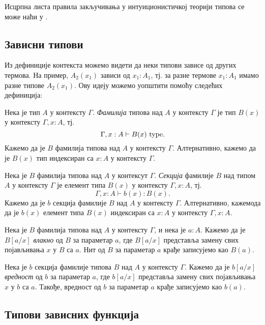 \documentclass[12pt,oneside]{memoir}
\begin{document}
Исцрпна листа правила закључивања у интуиционистичкој теорији типова се може наћи у \cite{rijke2022intro}.

\subsection{Зависни типови}

Из дефиниције контекста можемо видети да неки типови зависе од других термова. На пример, $A_2(x_1)$ зависи од $x_1 : A_1$, тј. за разне термове $x_1 : A_1$ имамо разне типове $A_2(x_1)$. Ову идеју можемо уопштити помоћу следећих дефиниција:

\begin{definition}
    Нека је тип $A$ у контексту $\Gamma$. \emph{Фамилија} типова над $A$ у контексту $\Gamma$ је тип $B(x)$ у контексту $\Gamma, x : A$, тј.
    \[\Gamma, x : A \vdash B(x)~{\mathrm{type}}.\]
    Кажемо да је $B$ фамилија типова над $A$ у контексту $\Gamma$. Алтернативно, кажемо да је $B(x)$ тип индексиран са $x : A$ у контексту $\Gamma$.
\end{definition}

\begin{definition}
    Нека је $B$ фамилија типова над $A$ у контексут $\Gamma$. \emph{Секција} фамилије $B$ над типом $A$ у контексту $\Gamma$ је елемент типа $B(x)$ у контексту $\Gamma, x : A$, тј.
    \[\Gamma, x : A \vdash b(x) : B(x).\]
    Кажемо да је $b$ секција фамилије $B$ над $A$ у контексту $\Gamma$. Алтернативно, кажемода да је $b(x)$ елемент типа $B(x)$ индексиран са $x : A$ у контексту $\Gamma, x : A$. 
\end{definition}

\begin{definition}
    Нека је $B$ фамилија типова над $A$ у контексту $\Gamma$, и нека је $a : A$. Кажемо да је $B[a/x]$ \emph{влакно} од $B$ за параметар $a$, где $B[a/x]$ представља замену свих појављивања $x$ у $B$ са $a$. Нит од $B$ за параметар $a$ крађе записујемо као $B(a)$.
\end{definition}

\begin{definition}
    Нека је $b$ секција фамилије типова $B$ над $A$ у контексту $\Gamma$. Кажемо да је $b[a/x]$ \emph{вредност} од $b$ за параметар $a$, где $b[a/x]$ представља замену свих појављивања $x$ у $b$ са $a$. Такође, вредност од $b$ за параметар $a$ крађе записујемо као $b(a)$.
\end{definition}

\subsection{Типови зависних функција}
\end{document}
